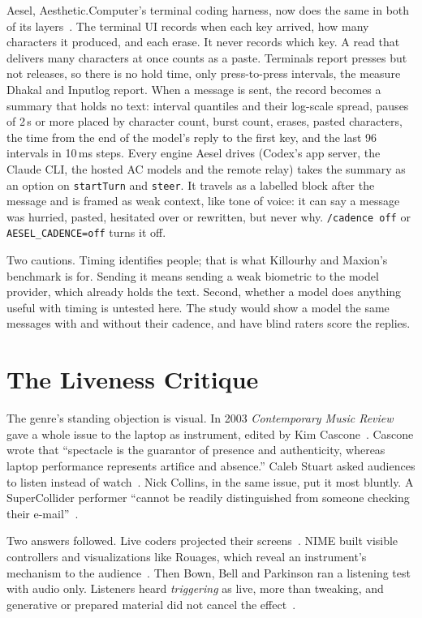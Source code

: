 \documentclass[10pt,letterpaper,twocolumn]{article}
\newcommand{\acdot}{{\color{acpink}.}}
\newcommand{\ac}{Aesthetic{\acdot}Computer}
\begin{document}
Aesel, \ac{}'s terminal coding harness, now does the same in both of its layers~\citep{scudder2026aesel}. The terminal UI records when each key arrived, how many characters it produced, and each erase. It never records which key. A read that delivers many characters at once counts as a paste. Terminals report presses but not releases, so there is no hold time, only press-to-press intervals, the measure Dhakal and Inputlog report. When a message is sent, the record becomes a summary that holds no text: interval quantiles and their log-scale spread, pauses of 2\,s or more placed by character count, burst count, erases, pasted characters, the time from the end of the model's reply to the first key, and the last 96 intervals in 10\,ms steps. Every engine Aesel drives (Codex's app server, the Claude CLI, the hosted AC models and the remote relay) takes the summary as an option on \texttt{startTurn} and \texttt{steer}. It travels as a labelled block after the message and is framed as weak context, like tone of voice: it can say a message was hurried, pasted, hesitated over or rewritten, but never why. \texttt{/cadence off} or \texttt{AESEL\_CADENCE=off} turns it off.

Two cautions. Timing identifies people; that is what Killourhy and Maxion's benchmark is for. Sending it means sending a weak biometric to the model provider, which already holds the text. Second, whether a model does anything useful with timing is untested here. The study would show a model the same messages with and without their cadence, and have blind raters score the replies.

\section{The Liveness Critique}

The genre's standing objection is visual. In 2003 \emph{Contemporary Music Review} gave a whole issue to the laptop as instrument, edited by Kim Cascone~\citep{cascone2003grain}. Cascone wrote that ``spectacle is the guarantor of presence and authenticity, whereas laptop performance represents artifice and absence.'' Caleb Stuart asked audiences to listen instead of watch~\citep{stuart2003object}. Nick Collins, in the same issue, put it most bluntly. A SuperCollider performer ``cannot be readily distinguished from someone checking their e-mail''~\citep{collins2003generative}.

Two answers followed. Live coders projected their screens~\citep{collins2003livecoding,mclean2010visualisation}. NIME built visible controllers and visualizations like Rouages, which reveal an instrument's mechanism to the audience~\citep{berthaut2013rouages}. Then Bown, Bell and Parkinson ran a listening test with audio only. Listeners heard \emph{triggering} as live, more than tweaking, and generative or prepared material did not cancel the effect~\citep{bown2014liveness}.
\end{document}

